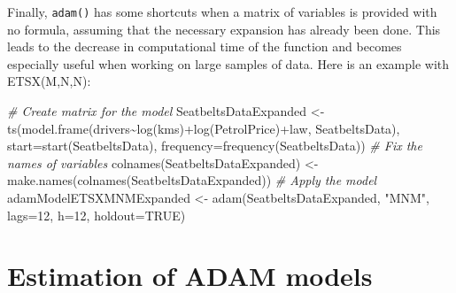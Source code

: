 \documentclass[
]{book}
\newenvironment{Shaded}{\begin{snugshade}}{\end{snugshade}}
\newcommand{\AttributeTok}[1]{\textcolor[rgb]{0.77,0.63,0.00}{#1}}
\newcommand{\CommentTok}[1]{\textcolor[rgb]{0.56,0.35,0.01}{\textit{#1}}}
\newcommand{\ConstantTok}[1]{\textcolor[rgb]{0.00,0.00,0.00}{#1}}
\newcommand{\DecValTok}[1]{\textcolor[rgb]{0.00,0.00,0.81}{#1}}
\newcommand{\FunctionTok}[1]{\textcolor[rgb]{0.00,0.00,0.00}{#1}}
\newcommand{\NormalTok}[1]{#1}
\newcommand{\OtherTok}[1]{\textcolor[rgb]{0.56,0.35,0.01}{#1}}
\newcommand{\SpecialCharTok}[1]{\textcolor[rgb]{0.00,0.00,0.00}{#1}}
\newcommand{\StringTok}[1]{\textcolor[rgb]{0.31,0.60,0.02}{#1}}
\theoremstyle{definition}
\theoremstyle{definition}
\theoremstyle{definition}
\theoremstyle{definition}
\theoremstyle{remark}
\begin{document}
Finally, \texttt{adam()} has some shortcuts when a matrix of variables is provided with no formula, assuming that the necessary expansion has already been done. This leads to the decrease in computational time of the function and becomes especially useful when working on large samples of data. Here is an example with ETSX(M,N,N):

\begin{Shaded}
\begin{Highlighting}[]
\CommentTok{\# Create matrix for the model}
\NormalTok{SeatbeltsDataExpanded }\OtherTok{\textless{}{-}}
  \FunctionTok{ts}\NormalTok{(}\FunctionTok{model.frame}\NormalTok{(drivers}\SpecialCharTok{\textasciitilde{}}\FunctionTok{log}\NormalTok{(kms)}\SpecialCharTok{+}\FunctionTok{log}\NormalTok{(PetrolPrice)}\SpecialCharTok{+}\NormalTok{law,}
\NormalTok{              SeatbeltsData),}
  \AttributeTok{start=}\FunctionTok{start}\NormalTok{(SeatbeltsData), }\AttributeTok{frequency=}\FunctionTok{frequency}\NormalTok{(SeatbeltsData))}
\CommentTok{\# Fix the names of variables}
\FunctionTok{colnames}\NormalTok{(SeatbeltsDataExpanded) }\OtherTok{\textless{}{-}}
  \FunctionTok{make.names}\NormalTok{(}\FunctionTok{colnames}\NormalTok{(SeatbeltsDataExpanded))}
\CommentTok{\# Apply the model}
\NormalTok{adamModelETSXMNMExpanded }\OtherTok{\textless{}{-}} \FunctionTok{adam}\NormalTok{(SeatbeltsDataExpanded, }\StringTok{"MNM"}\NormalTok{,}
                                 \AttributeTok{lags=}\DecValTok{12}\NormalTok{, }\AttributeTok{h=}\DecValTok{12}\NormalTok{, }\AttributeTok{holdout=}\ConstantTok{TRUE}\NormalTok{)}
\end{Highlighting}
\end{Shaded}

\hypertarget{ADAMETSEstimation}{%
\chapter{Estimation of ADAM models}\label{ADAMETSEstimation}}
\end{document}
